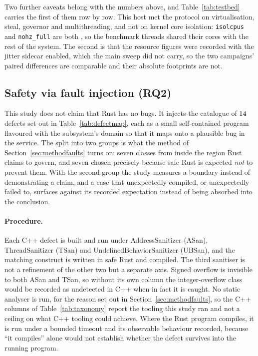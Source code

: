 \documentclass[english,oneside,a4paper,censored,csm,software-track-2020]{HYthesisML}
\begin{document}
Two further caveats belong with the numbers above, and Table~\ref{tab:testbed} carries the first of
them row by row. This host met the protocol on virtualisation, steal, governor and multithreading,
and not on kernel core isolation: \texttt{isolcpus} and \texttt{nohz\_full} are both
\BmIsolcpus{}, so the benchmark threads shared their cores with the rest of the system. The second
is that the resource figures were recorded with the jitter sidecar enabled, which the main sweep did
not carry, so the two campaigns' paired differences are comparable and their absolute footprints are
not.

\subsection{Safety via fault injection (RQ2)}\label{sec:safetyresults}
This study does not claim that Rust has no bugs. It injects the catalogue of
$14$ defects set out
in Table~\ref{tab:defectmap}, each as a small self-contained program
flavoured with the subsystem's domain so that it maps onto a plausible bug in the service. The
split into two groups is what the method of Section~\ref{sec:methodfaults} turns on: seven
classes from inside the region Rust claims to govern, and seven chosen precisely because safe
Rust is expected \emph{not} to prevent them. With the second group the study measures a boundary
instead of demonstrating a claim, and a case that unexpectedly compiled, or unexpectedly failed
to, surfaces against its recorded expectation instead of being absorbed into the conclusion.

\paragraph{Procedure.}
Each C++ defect is built and run under AddressSanitizer (ASan), ThreadSanitizer (TSan) and
UndefinedBehaviorSanitizer (UBSan), and the matching construct is written in safe Rust and
compiled. The third sanitiser is not a refinement of the other two but a separate axis. Signed
overflow is invisible to both ASan and TSan, so without its own column the integer-overflow class
would be recorded as undetected in C++ when in fact it is caught. No static analyser is
run, for the reason set out in Section~\ref{sec:methodfaults}, so the C++ columns of
Table~\ref{tab:taxonomy} report the tooling this study ran and not a ceiling on what C++ tooling
could achieve. Where the Rust program compiles, it is run under a bounded timeout and its
observable behaviour recorded, because ``it compiles'' alone would not establish whether the
defect survives into the running program.
\end{document}
